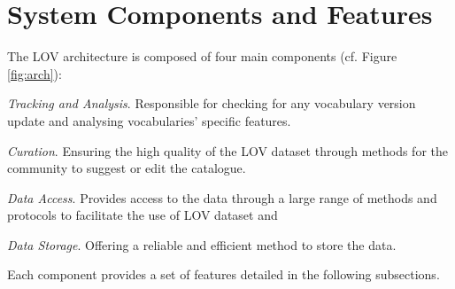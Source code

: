\documentclass{iosart2c}
\begin{document}
\section{System Components and Features}\label{sec:arch}
	 The LOV architecture is composed of four main components (cf. Figure \ref{fig:arch}): 
\begin{inparaenum}[1)] 
	\item \emph{Tracking and Analysis}. Responsible for checking for any vocabulary version update and analysing vocabularies' specific features.
	\item \emph{Curation}. Ensuring the high quality of the LOV dataset through methods for the community to suggest or edit the catalogue.
	\item \emph{Data Access}. Provides access to the data through a large range of methods and protocols to facilitate the use of LOV dataset and
	\item \emph{Data Storage}. Offering a reliable and efficient method to store the data.
\end{inparaenum} 
Each component provides a set of features detailed in the following subsections.

\end{document}

